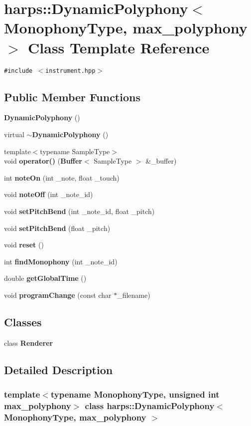 \section{harps::DynamicPolyphony$<$ MonophonyType, max\_\-polyphony $>$ Class Template Reference}
\label{classharps_1_1DynamicPolyphony}
{\tt \#include $<$instrument.hpp$>$}

\subsection*{Public Member Functions}
\begin{CompactItemize}
\item 
{\bf DynamicPolyphony} ()
\item 
virtual {\bf $\sim$DynamicPolyphony} ()
\item 
{\footnotesize template$<$typename SampleType$>$ }\\void {\bf operator()} ({\bf Buffer}$<$ SampleType $>$ \&\_\-buffer)
\item 
int {\bf noteOn} (int \_\-note, float \_\-touch)
\item 
void {\bf noteOff} (int \_\-note\_\-id)
\item 
void {\bf setPitchBend} (int \_\-note\_\-id, float \_\-pitch)
\item 
void {\bf setPitchBend} (float \_\-pitch)
\item 
void {\bf reset} ()
\item 
int {\bf findMonophony} (int \_\-note\_\-id)
\item 
double {\bf getGlobalTime} ()
\item 
void {\bf programChange} (const char $\ast$\_\-filename)
\end{CompactItemize}
\subsection*{Classes}
\begin{CompactItemize}
\item 
class \textbf{Renderer}
\end{CompactItemize}


\subsection{Detailed Description}
\subsubsection*{template$<$typename MonophonyType, unsigned int max\_\-polyphony$>$ class harps::DynamicPolyphony$<$ MonophonyType, max\_\-polyphony $>$}

